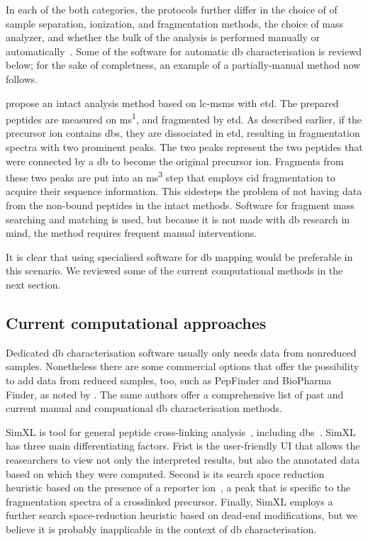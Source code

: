 In each of the both categories, the protocols further differ in the choice of of sample separation, ionization, and fragmentation methods, the choice of mass analyzer, and whether the bulk of the analysis is performed manually or automatically~\cite{lakbub2018recent}. Some of the software for automatic \gls*{db} characterisation is reviewd below; for the sake of completness, an example of a partially-manual method now follows.

\citet{wu2009mass} propose an intact analysis method based on \gls*{lc}-\gls*{msms} with \gls*{etd}\@. The prepared peptides are measured on \gls*{ms}\textsuperscript{1}, and fragmented by \gls*{etd}\@. As described earlier, if the precursor ion contains \glspl*{db}, they are dissociated in \gls*{etd}, resulting in fragmentation spectra with two prominent peaks. The two peaks represent the two peptides that were connected by a \gls*{db} to become the original precursor ion. Fragments from these two peaks are put into an \gls*{ms}\textsuperscript{3} step that employs \gls*{cid} fragmentation to acquire their sequence information. This sidesteps the problem of not having data from the non-bound peptides in the intact methods. Software for fragment mass searching and matching is used, but because it is not made with \gls*{db} research in mind, the method requires frequent manual interventions.

It is clear that using specialised software for \gls*{db} mapping would be preferable in this scenario. We reviewed some of the current computational methods in the next section.

\subsection{Current computational approaches}

Dedicated \gls*{db} characterisation software usually only needs data from nonreduced samples. Nonetheless there are some commercial options that offer the possibility to add data from reduced samples, too, such as PepFinder and BioPharma Finder, as noted by \citet{lakbub2018recent}. The same authors offer a comprehensive list of past and current manual and compuational \gls*{db} characterisation methods.

SimXL is tool for general peptide cross-linking analysis~\cite{lima2015sim}, including \glspl*{db}~\cite{cui2019comprehensive}. SimXL has three main differentiating factors. Frist is the user-friendly UI that allows the reasearchers to view not only the interpreted results, but also the annotated data based on which they were computed. Second is its search space reduction heuristic based on the presence of a reporter ion~\cite{iglesias2010identification}, a peak that is specific to the fragmentation spectra of a crosslinked precursor. Finally, SimXL employs a further search space-reduction heuristic based on dead-end modifications, but we believe it is probably inapplicable in the context of \gls*{db} characterisation.

